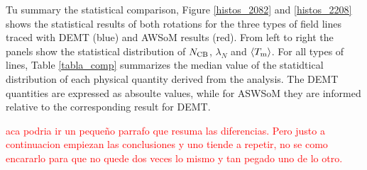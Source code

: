 \documentclass[namedreferences]{solarphysics}
\newcommand{\lN}{\lambda_N}
\newcommand{\NCB}{N_{\rm CB}}
\newcommand{\Tm}{T_{\rm m}}
\newcommand{\aTm}{\left<\Tm\right>}
\def\diego#1{\textcolor{red}{#1}}
\begin{document}
\begin{article}
Tu summary the statistical comparison, Figure \ref{histos_2082} and \ref{histos_2208} shows the statistical results of both rotations for the three types of field lines traced with DEMT (blue) and AWSoM results (red). From left to right the panels show the statistical distribution of $\NCB$, $\lN$ and $\aTm$. For all types of lines, Table \ref{tabla_comp} summarizes the median value of the statidtical distribution of each physical quantity derived from the analysis. The DEMT quantities are expressed as absoulte values, while for ASWSoM they are informed relative to the corresponding result for DEMT.


\diego{aca podria ir un pequeño parrafo que resuma las diferencias. Pero justo a continuacion empiezan las conclusiones y uno tiende a repetir, no se como encararlo para que no quede dos veces lo mismo y tan pegado uno de lo otro.}


\end{article}
\end{document}
